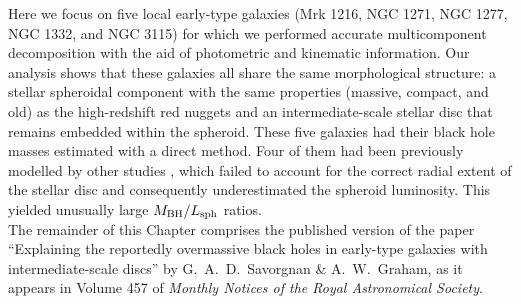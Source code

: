 Here we focus on five local early-type galaxies (Mrk 1216, NGC 1271, NGC 1277, NGC 1332, and NGC 3115) 
for which we performed accurate multicomponent decomposition 
with the aid of photometric and kinematic information. 
Our analysis shows that these galaxies all share the same morphological structure: 
a stellar spheroidal component with the same properties (massive, compact, and old) as the high-redshift red nuggets 
and an intermediate-scale stellar disc that remains embedded within the spheroid. 
These five galaxies had their black hole masses estimated with a direct method.  
Four of them had been previously modelled by other studies \citep{rusli2011,vandenbosch2012,walsh2015,yildirim2015}, 
which failed to account for the correct radial extent of the stellar disc 
and consequently underestimated the spheroid luminosity.
This yielded unusually large $M_{\rm BH} / L_{\rm sph}$ ratios.  \\

The remainder of this Chapter comprises the published version of the paper 
``Explaining the reportedly overmassive black holes in early-type galaxies with intermediate-scale discs'' 
by G.~A.~D.~Savorgnan \& A.~W.~Graham,  
as it appears in Volume 457 of \emph{Monthly Notices of the Royal Astronomical Society}. 


